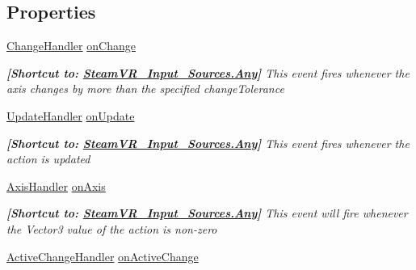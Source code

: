 \subsection*{Properties}
\begin{DoxyCompactItemize}
\item 
\mbox{\hyperlink{class_valve_1_1_v_r_1_1_steam_v_r___action___vector3_a78943f89733a1c1a8e12cb4896e65907}{Change\+Handler}} \mbox{\hyperlink{class_valve_1_1_v_r_1_1_steam_v_r___action___vector3_a9617101f10185cceb79de772bff1bd9b}{on\+Change}}
\begin{DoxyCompactList}\small\item\em {\bfseries{\mbox{[}Shortcut to\+: \mbox{\hyperlink{namespace_valve_1_1_v_r_a82e5bf501cc3aa155444ee3f0662853faed36a1ef76a59ee3f15180e0441188ad}{Steam\+V\+R\+\_\+\+Input\+\_\+\+Sources.\+Any}}\mbox{]}}} This event fires whenever the axis changes by more than the specified change\+Tolerance \end{DoxyCompactList}\item 
\mbox{\hyperlink{class_valve_1_1_v_r_1_1_steam_v_r___action___vector3_a99c0524f104c6d8c94a0e874b0ecc813}{Update\+Handler}} \mbox{\hyperlink{class_valve_1_1_v_r_1_1_steam_v_r___action___vector3_aa852fea6cefb457d963fae362b2a8b42}{on\+Update}}
\begin{DoxyCompactList}\small\item\em {\bfseries{\mbox{[}Shortcut to\+: \mbox{\hyperlink{namespace_valve_1_1_v_r_a82e5bf501cc3aa155444ee3f0662853faed36a1ef76a59ee3f15180e0441188ad}{Steam\+V\+R\+\_\+\+Input\+\_\+\+Sources.\+Any}}\mbox{]}}} This event fires whenever the action is updated \end{DoxyCompactList}\item 
\mbox{\hyperlink{class_valve_1_1_v_r_1_1_steam_v_r___action___vector3_a9b135b663b22c421dc36dbc48d2d35b6}{Axis\+Handler}} \mbox{\hyperlink{class_valve_1_1_v_r_1_1_steam_v_r___action___vector3_a8bf8b824979af5005bc7d2b379781ee4}{on\+Axis}}
\begin{DoxyCompactList}\small\item\em {\bfseries{\mbox{[}Shortcut to\+: \mbox{\hyperlink{namespace_valve_1_1_v_r_a82e5bf501cc3aa155444ee3f0662853faed36a1ef76a59ee3f15180e0441188ad}{Steam\+V\+R\+\_\+\+Input\+\_\+\+Sources.\+Any}}\mbox{]}}} This event will fire whenever the Vector3 value of the action is non-\/zero \end{DoxyCompactList}\item 
\mbox{\hyperlink{class_valve_1_1_v_r_1_1_steam_v_r___action___vector3_a47d6c1c558fb45841cd626df9ab3dcb9}{Active\+Change\+Handler}} \mbox{\hyperlink{class_valve_1_1_v_r_1_1_steam_v_r___action___vector3_a4e3133aec6465e1d5b17bd695ae9a579}{on\+Active\+Change}}

\end{DoxyCompactItemize}
